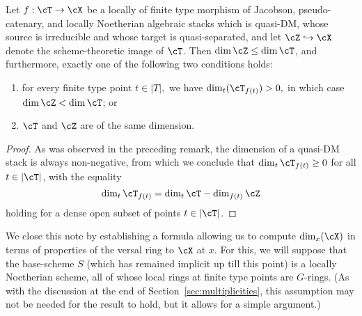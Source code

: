 \begin{acor}
	\label{cor:dims of images}
	Let $f: \cT \to \cX$ be a locally of finite type
	morphism of Jacobson, pseudo-catenary, and locally Noetherian 
	algebraic stacks
        which is quasi-DM,
	whose source is irreducible and whose target is quasi-separated,
	and let $\cZ \hookrightarrow \cX$ denote the scheme-theoretic
	image of $\cT$.
	Then $\dim \cZ \leq \dim \cT$,
	and furthermore, exactly one of the following two conditions holds:
	\begin{enumerate}
		\item for every finite type point $t \in |T|,$
			we have
			$\dim_t(\cT_{f(t)}) > 0,$ in which
			case $\dim \cZ < \dim \cT$; or
		\item   $\cT$ and $\cZ$
			are of the same dimension.
	\end{enumerate}
\end{acor}
\begin{proof}
	As was observed in the preceding remark,
	the dimension of a quasi-DM stack is always non-negative,
	from which we conclude that $\dim_t \cT_{f(t)} \geq 0$
	for all $t \in |\cT|$, with the equality
	$$\dim_t \cT_{f(t)} = \dim_t \cT - \dim_{f(t)} \cZ$$ holding
	for a dense open subset of points $t\in |\cT|$.
\end{proof}

We close this note by establishing a formula allowing us to
compute $\dim_x(\cX)$ in terms of properties of the versal ring
to $\cX$ at $x$.
For this, 
we will suppose that the base-scheme $S$ (which has remained implicit
up till this point) is a locally Noetherian scheme, all of whose local rings 
at finite type points are $G$-rings. (As with the discussion at the
end of Section~\ref{sec:multiplicities}, this assumption may not be 
needed for the result to hold, but it allows for a simple argument.)

